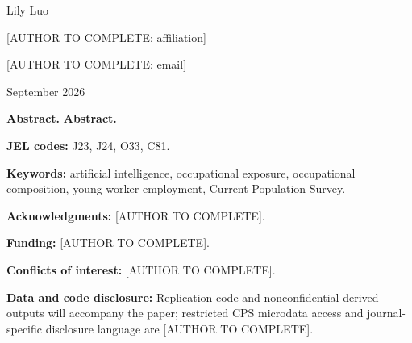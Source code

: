 \begin{titlepage}
\centering
\vspace*{0.05in}
{\Large\bfseries \papertitle\par}
\vspace{0.2in}
{\large Lily Luo\par}
\vspace{0.05in}
{\normalsize [AUTHOR TO COMPLETE: affiliation]\par}
{\normalsize [AUTHOR TO COMPLETE: email]\par}
\vspace{0.15in}
{\normalsize September 2026\par}
\vspace{0.2in}
\begin{minipage}{0.94\textwidth}
\ifdefined\RESTATMODE
\textbf{Abstract.}\quad
\else
\textbf{Abstract.}\quad
\fi

\vspace{0.15in}
\noindent\textbf{JEL codes:} J23, J24, O33, C81.

\noindent\textbf{Keywords:} artificial intelligence, occupational exposure, occupational composition, young-worker employment, Current Population Survey.

\vspace{0.1in}
\noindent\textbf{Acknowledgments:} [AUTHOR TO COMPLETE].

\noindent\textbf{Funding:} [AUTHOR TO COMPLETE].

\noindent\textbf{Conflicts of interest:} [AUTHOR TO COMPLETE].

\noindent\textbf{Data and code disclosure:} Replication code and nonconfidential derived outputs will accompany the paper; restricted CPS microdata access and journal-specific disclosure language are [AUTHOR TO COMPLETE].
\end{minipage}
\vfill
\end{titlepage}
